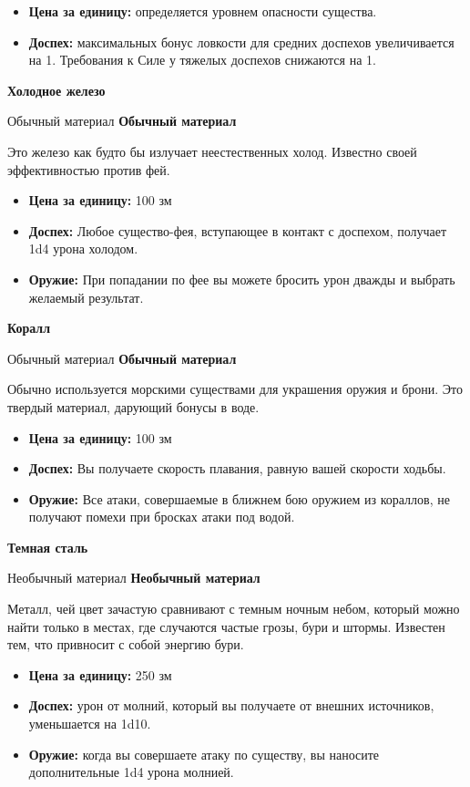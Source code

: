 \documentclass[a4paper, 9pt, twocolumn]{book}
\newcommand{\partc}[2][]{{
		\bigskip
		\noindent
		\hspace{-0.25cm}
		\fontsize{11pt}{13.2}
		\color{sectioncolor}
		\textbf{#2}}
	
	{
		\ifx\relax#1\relax
		\else
		\noindent
		\normalcolor
		\textbf{#1}}
	\bigskip
	\fi
}
\begin{document}
	\begin{itemize}
		\item \textbf{Цена за единицу:} определяется уровнем опасности существа.
		
		\item \textbf{Доспех:} максимальных бонус ловкости для средних доспехов увеличивается на 1. Требования к Силе у тяжелых доспехов снижаются на 1.
	\end{itemize}

	\partc[Обычный материал]{Холодное железо}
	
	\noindent Это железо как будто бы излучает неестественных холод. Известно своей эффективностью против фей.
	
	\begin{itemize}
		\item \textbf{Цена за единицу:} 100 зм
		
		\item \textbf{Доспех:} Любое существо-фея, вступающее в контакт с доспехом, получает 1d4 урона холодом.
		
		\item \textbf{Оружие:} При попадании по фее вы можете бросить урон дважды и выбрать желаемый результат.
	\end{itemize}

	\partc[Обычный материал]{Коралл}
	
	\noindent Обычно используется морскими существами для украшения оружия и брони. Это твердый материал, дарующий бонусы в воде.
	
	\begin{itemize}
		\item \textbf{Цена за единицу:} 100 зм
		
		\item \textbf{Доспех:} Вы получаете скорость плавания, равную вашей скорости ходьбы.
		
		\item \textbf{Оружие:} Все атаки, совершаемые в ближнем бою оружием из кораллов, не получают помехи при бросках атаки под водой.
	\end{itemize}

	\partc[Необычный материал]{Темная сталь}
	
	\noindent Металл, чей цвет зачастую сравнивают с темным ночным небом, который можно найти только в местах, где случаются частые грозы, бури и штормы. Известен тем, что привносит с собой энергию бури.
	
	\begin{itemize}
		\item \textbf{Цена за единицу:} 250 зм
		
		\item \textbf{Доспех:} урон от молний, который вы получаете от внешних источников, уменьшается на 1d10.
		
		\item \textbf{Оружие:} когда вы совершаете атаку по существу, вы наносите дополнительные 1d4 урона молнией.
	\end{itemize}
\end{document}
